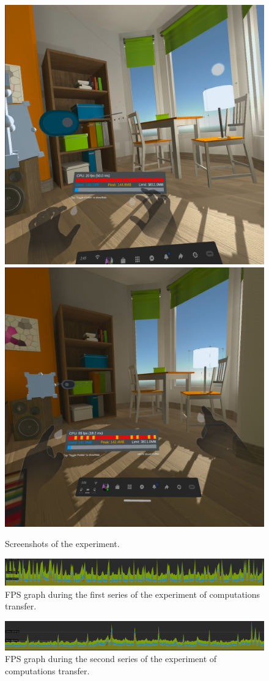 \begin{figure}
  \centering
    {\includegraphics[width=0.45\linewidth]{figures/Series1FPSOculus.jpg}}
    {\includegraphics[width=0.45\linewidth]{figures/Series2FPSOculus.jpg}}
  \caption{Screenshots of the experiment.}
  \label{fig:exp-screenshot}
\end{figure}

\begin{figure}
  \centering
  \includegraphics[width = 0.9 \linewidth]{figures/Series2FPSpng.png}
  \caption{FPS graph during the first series of the experiment of computations transfer.}
  \label{fig:Series2FPSpng-figure}
\end{figure}

\begin{figure}
  \centering
  \includegraphics[width = 0.9 \linewidth]{figures/Series1FPS.png}
  \caption{FPS graph during the second series of the experiment of computations transfer.}
  \label{fig:Series1FPSpng-figure}
\end{figure}

